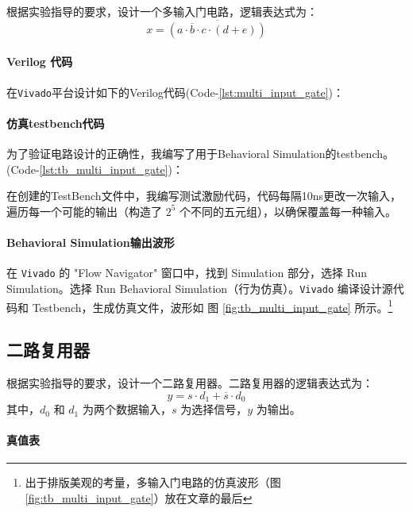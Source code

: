 \documentclass[10pt,a4paper,twoside]{rho-class/rho}
\begin{document}
        根据实验指导的要求，设计一个多输入门电路，逻辑表达式为：
        \[
        x = \overline{(a \cdot \overline{b} \cdot c \cdot (d + e))}
        \]
        
        \paragraph{Verilog 代码} 
            在\verb|Vivado|平台设计如下的Verilog代码(Code-\ref{lst:multi_input_gate})：
                
        
        \paragraph{仿真testbench代码}
            为了验证电路设计的正确性，我编写了用于Behavioral Simulation的testbench。(Code-\ref{lst:tb_multi_input_gate})：
                
            在创建的TestBench文件中，我编写测试激励代码，代码每隔10ns更改一次输入，遍历每一个可能的输出（构造了 $2^5$ 个不同的五元组），以确保覆盖每一种输入。

        \paragraph{Behavioral Simulation输出波形}
            在 \verb|Vivado| 的 "Flow Navigator" 窗口中，找到 Simulation 部分，选择 Run Simulation。选择 Run Behavioral Simulation（行为仿真）。\verb|Vivado| 编译设计源代码和 Testbench，生成仿真文件，波形如            图 \ref{fig:tb_multi_input_gate} 所示。\footnote{出于排版美观的考量，多输入门电路的仿真波形（图 \ref{fig:tb_multi_input_gate}）放在文章的最后}
        


        
    \subsection{二路复用器}
        根据实验指导的要求，设计一个二路复用器。二路复用器的逻辑表达式为：
        \[
        y = s \cdot d_1 + \overline{s} \cdot d_0
        \]
        其中，$d_0$ 和 $d_1$ 为两个数据输入，$s$ 为选择信号，$y$ 为输出。
        
        \paragraph{真值表}
        
\end{document}
